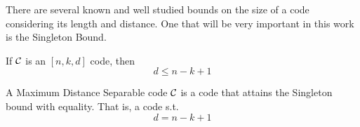 There are several known and well studied bounds on the size of a code considering its length and distance. One that will be very important in this work is the Singleton Bound.

\begin{thm} If ${\mathcal C}$ is an $[n,k,d]$ code, then 
\begin{equation}
d \leq n - k + 1
\end{equation}
\end{thm}

\begin{defn}
A Maximum Distance Separable code ${\mathcal C}$ is a code that attains the Singleton bound with equality. That is, a code s.t.
\begin{equation}
d = n - k + 1
\end{equation}
\end{defn}